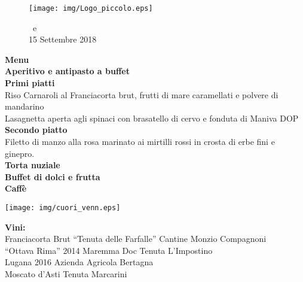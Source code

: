 \documentclass[11pt]{book}
\begin{document}
\begin{center}
\begin{figure}
\centering
\texttt{[image: img/Logo\_piccolo.eps]}

\NSposo \ e \NSposa\\
15 Settembre 2018\\
\end{figure}
\vfill
\Huge \textbf{Menu}\\
\hfill\break
\normalsize\textbf{Aperitivo e antipasto a buffet}\\
\hfill\break
\textbf{Primi piatti}\\
Riso Carnaroli al Franciacorta brut, frutti di mare caramellati e polvere di mandarino\\
\hfill\break
Lasagnetta aperta agli spinaci con brasatello di cervo e fonduta di Maniva DOP\\
\hfill\break
\textbf{Secondo piatto}\\
Filetto di manzo alla rosa marinato ai mirtilli rossi in crosta di erbe fini e ginepro.\\
\hfill\break
\textbf{Torta nuziale}\\
\textbf{Buffet di dolci e frutta}\\
\textbf{Caffè}\\
\vfill
\begin{center}
\texttt{[image: img/cuori\_venn.eps]}
\end{center}
\end{center}
\vfill
\noindent\scriptsize\textbf{Vini:}\\
Franciacorta Brut “Tenuta delle Farfalle” Cantine Monzio Compagnoni\\
\footnotesize“Ottava Rima” 2014 Maremma Doc Tenuta L’Impostino\\
Lugana 2016 Azienda Agricola Bertagna\\
Moscato d’Asti Tenuta Marcarini\\

\begin{figure}[h!]
\centering
\def\svgscale{0.5}
\end{figure}
\end{document}

